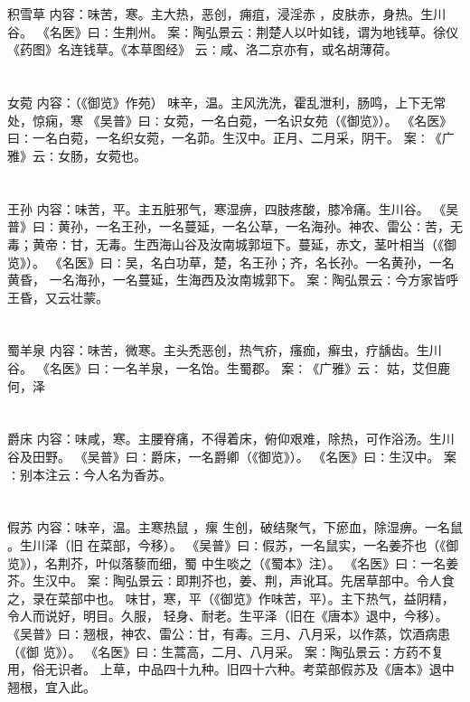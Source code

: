 \documentclass[12pt,UTF8]{ctexbook}
\begin{document}
\chapter{}积雪草
内容：味苦，寒。主大热，恶创，痈疽，浸淫赤 ，皮肤赤，身热。生川谷。 
《名医》曰∶生荆州。 
案∶陶弘景云∶荆楚人以叶如钱，谓为地钱草。徐仪《药图》名连钱草。《本草图经》 
云∶咸、洛二京亦有，或名胡薄荷。 


\chapter{}女菀
内容：（《御览》作苑） 
味辛，温。主风洗洗，霍乱泄利，肠鸣，上下无常处，惊痫，寒 
《吴普》曰∶女菀，一名白菀，一名识女苑（《御览》）。 
《名医》曰∶一名白菀，一名织女菀，一名茆。生汉中。正月、二月采，阴干。 
案∶《广雅》云∶女肠，女菀也。 


\chapter{}王孙
内容：味苦，平。主五脏邪气，寒湿痹，四肢疼酸，膝冷痛。生川谷。 
《吴普》曰∶黄孙，一名王孙，一名蔓延，一名公草，一名海孙。神农、雷公∶苦，无 
毒；黄帝∶甘，无毒。生西海山谷及汝南城郭垣下。蔓延，赤文，茎叶相当（《御览》）。 
《名医》曰∶吴，名白功草，楚，名王孙；齐，名长孙。一名黄孙，一名黄昏， 
一名海孙，一名蔓延，生海西及汝南城郭下。 
案∶陶弘景云∶今方家皆呼王昏，又云壮蒙。 


\chapter{}蜀羊泉
内容：味苦，微寒。主头秃恶创，热气疥，瘙痂，癣虫，疗龋齿。生川谷。 
《名医》曰∶一名羊泉，一名饴。生蜀郡。 
案∶《广雅》云∶ 姑，艾但鹿何，泽 


\chapter{}爵床
内容：味咸，寒。主腰脊痛，不得着床，俯仰艰难，除热，可作浴汤。生川谷及田野。 
《吴普》曰∶爵床，一名爵卿（《御览》）。 
《名医》曰∶生汉中。 
案∶别本注云∶今人名为香苏。 


\chapter{}假苏
内容：味辛，温。主寒热鼠 ，瘰 生创，破结聚气，下瘀血，除湿痹。一名鼠 。生川泽（旧 
在菜部，今移）。 
《吴普》曰∶假苏，一名鼠实，一名姜芥也（《御览》），名荆芥，叶似落藜而细，蜀 
中生啖之（《蜀本》注）。 
《名医》曰∶一名姜芥。生汉中。 
案∶陶弘景云∶即荆芥也，姜、荆，声讹耳。先居草部中。令人食之，录在菜部中也。 
味甘，寒，平（《御览》作味苦，平）。主下热气，益阴精，令人而说好，明目。久服， 
轻身、耐老。生平泽（旧在《唐本》退中，今移）。 
《吴普》曰∶翘根，神农、雷公∶甘，有毒。三月、八月采，以作蒸，饮酒病患（《御 
览》）。 
《名医》曰∶生蒿高，二月、八月采。 
案∶陶弘景云∶方药不复用，俗无识者。 
上草，中品四十九种。旧四十六种。考菜部假苏及《唐本》退中翘根，宜入此。 
\end{document}
